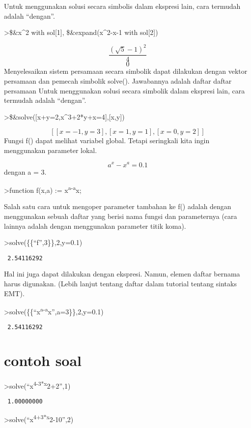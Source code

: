 \documentclass[
]{book}
\begin{document}
Untuk menggunakan solusi secara simbolis dalam ekspresi lain, cara termudah adalah ``dengan''.

\textgreater\$\&x\^{}2 with sol{[}1{]}, \$\&expand(x\^{}2-x-1 with sol{[}2{]})

\[\frac{\left(\sqrt{5}-1\right)^2}{4}\]\[0\]Menyelesaikan sistem persamaan secara simbolik dapat dilakukan dengan vektor persamaan dan pemecah simbolik solve(). Jawabannya adalah daftar daftar persamaan Untuk menggunakan solusi secara simbolik dalam ekspresi lain, cara termudah adalah ``dengan''.

\textgreater\$\&solve({[}x+y=2,x\^{}3+2*y+x=4{]},{[}x,y{]})

\[\left[ \left[ x=-1 , y=3 \right]  , \left[ x=1 , y=1 \right]  , 
 \left[ x=0 , y=2 \right]  \right] \]Fungsi f() dapat melihat variabel global. Tetapi seringkali kita ingin menggunakan parameter lokal.

\[a^x-x^a = 0.1\]dengan a = 3.

\textgreater function f(x,a) := x\textsuperscript{a-a}x;

Salah satu cara untuk mengoper parameter tambahan ke f() adalah dengan menggunakan sebuah daftar yang berisi nama fungsi dan parameternya (cara lainnya adalah dengan menggunakan parameter titik koma).

\textgreater solve(\{\{``f'',3\}\},2,y=0.1)

\begin{verbatim}
 2.54116292 
\end{verbatim}

Hal ini juga dapat dilakukan dengan ekspresi. Namun, elemen daftar bernama harus digunakan. (Lebih lanjut tentang daftar dalam tutorial tentang sintaks EMT).

\textgreater solve(\{\{``x\textsuperscript{a-a}x'',a=3\}\},2,y=0.1)

\begin{verbatim}
 2.54116292 
\end{verbatim}

\section{contoh soal}\label{contoh-soal-8}

\textgreater solve(``x\textsuperscript{4-3*x}2+2'',1)

\begin{verbatim}
 1.00000000 
\end{verbatim}

\textgreater solve(``x\textsuperscript{4+3*x}2-10'',2)
\end{document}
